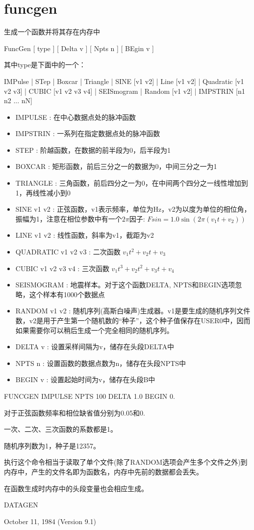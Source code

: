 \section{funcgen}
\label{cmd:funcgen}

生成一个函数并将其存在内存中

FuncGen [ type ] [ Delta v ] [ Npts n ] [ BEgin v ]

其中type是下面中的一个：

IMPulse | STep | Boxcar | Triangle | SINE [v1 v2] | Line [v1 v2] |
Quadratic [v1 v2 v3] | CUBIC [v1 v2 v3 v4] | SEISmogram | Random [v1 v2]
| IMPSTRIN  [n1 n2 ... nN]

\begin{itemize}
\item IMPULSE : 在中心数据点处的脉冲函数 
\item IMPSTRIN : 一系列在指定数据点处的脉冲函数  
\item STEP :  阶越函数，在数据的前半段为0，后半段为1 
\item BOXCAR : 矩形函数，前后三分之一的数据为0，中间三分之一为1 
\item TRIANGLE : 三角函数，前后四分之一为0，在中间两个四分之一线性增加到1，再线性减小到0 
\item SINE v1 v2 : 正弦函数，v1表示频率，单位为Hz，v2为以度为单位的相位角，振幅为1，注意在相位参数中有一个$2\pi$因子: $ Fsin = 1.0 \sin (2\pi (v_1t+v_2))$ 
\item LINE v1 v2 : 线性函数，斜率为v1，截距为v2 
\item QUADRATIC v1 v2 v3 : 二次函数 $v_1 t^{2} + v_2 t + v_3 $
\item CUBIC v1 v2 v3 v4 : 三次函数 $ v_1 t^{3} + v_2 t^2 + v_3t + v_4 $
\item SEISMOGRAM : 地震样本。对于这个函数DELTA, NPTS和BEGIN选项忽略，这个样本有1000个数据点 
\item RANDOM v1 v2 :  随机序列(高斯白噪声)生成器。v1是要生成的随机序列文件数，v2是用于产生第一个随机数的``种子''，这个种子值保存在USER0中，因而如果需要你可以稍后生成一个完全相同的随机序列。 
\item DELTA v : 设置采样间隔为v，储存在头段DELTA中 
\item NPTS n : 设置函数的数据点数为n，储存在头段NPTS中 
\item BEGIN v : 设置起始时间为v，储存在头段B中 
\end{itemize}

FUNCGEN IMPULSE NPTS 100 DELTA 1.0 BEGIN 0.

对于正弦函数频率和相位缺省值分别为0.05和0.

一次、二次、三次函数的系数都是1。

随机序列数为1，种子是12357。

执行这个命令相当于读取了单个文件(除了RANDOM选项会产生多个文件之外)到内存中，产生的文件名即为函数名，内存中先前的数据都会丢失。

在函数生成时内存中的头段变量也会相应生成。

DATAGEN

October 11, 1984 (Version 9.1)
